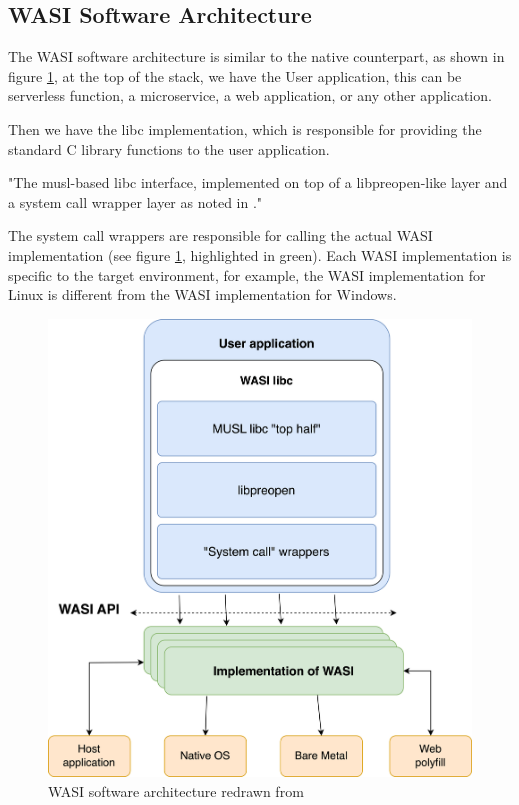 \subsection{WASI Software Architecture}
\label{subsec:wasi-software-architecture}

The WASI software architecture is similar to the native counterpart, as shown in figure \ref{fig:wasi-software-architecture}, at the top of the stack, we have the User application, this can be serverless function, a microservice, a web application, or any other application. 

Then we have the \gls{libc} implementation, which is responsible for providing the standard C library functions to the user application. 

"The musl-based libc interface, implemented on top of a libpreopen-like layer and a system call wrapper layer as noted in \cite[para. 1]{gohman_2019_wasi}."

The system call wrappers are responsible for calling the actual WASI implementation (see figure \ref{fig:wasi-software-architecture}, highlighted in green). Each WASI implementation is specific to the target environment, for example, the WASI implementation for Linux is different from the WASI implementation for Windows. 

\begin{figure}[htbp]
	\centering
		\includegraphics[width=130mm,scale=0.8]{images/wasm/WASI_Architecture.png}
	\caption{WASI software architecture redrawn from \cite{gohman_2019_wasi}}
	\label{fig:wasi-software-architecture}
\end{figure}

